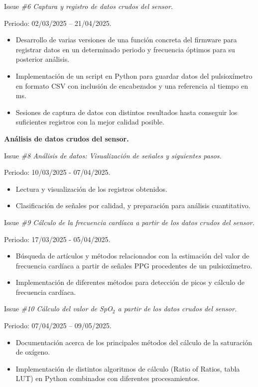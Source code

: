 Issue \textit{\#6 Captura y registro de datos crudos del sensor.}

Periodo: 02/03/2025 – 21/04/2025.

\begin{itemize}
    \item Desarrollo de varias versiones de una función concreta del firmware para registrar datos en un determinado periodo y frecuencia óptimos para su posterior análisis.
    \item Implementación de un script en Python para guardar datos del pulsioxímetro en formato CSV con inclusión de encabezados y una referencia al tiempo en ms.
    \item Sesiones de captura de datos con distintos resultados hasta conseguir los suficientes registros con la mejor calidad posible.
\end{itemize}

\textbf{Análisis de datos crudos del sensor.}

Issue \textit{\#8 Análisis de datos: Visualización de señales y siguientes pasos.}

Periodo: 10/03/2025 - 07/04/2025.

\begin{itemize}
    \item Lectura y visualización de los registros obtenidos.
    \item Clasificación de señales por calidad, y preparación para análisis cuantitativo.
\end{itemize}


Issue \textit{\#9 Cálculo de la frecuencia cardíaca a partir de los datos crudos del sensor.}

Periodo: 17/03/2025 - 05/04/2025.

\begin{itemize}
    \item Búsqueda de artículos y métodos relacionados con la estimación del valor de frecuencia cardíaca a partir de señales PPG procedentes de un pulsioxímetro.
    \item Implementación de diferentes métodos para detección de picos y cálculo de frecuencia cardíaca.
\end{itemize}


Issue \textit{\#10 Cálculo del valor de SpO$_2$ a partir de los datos crudos del sensor.}

Periodo: 07/04/2025 – 09/05/2025.

\begin{itemize}
    \item Documentación acerca de los principales métodos del cálculo de la saturación de oxígeno.
    \item Implementación de distintos algoritmos de cálculo (Ratio of Ratios, tabla LUT) en Python combinados con diferentes procesamientos.
\end{itemize}


